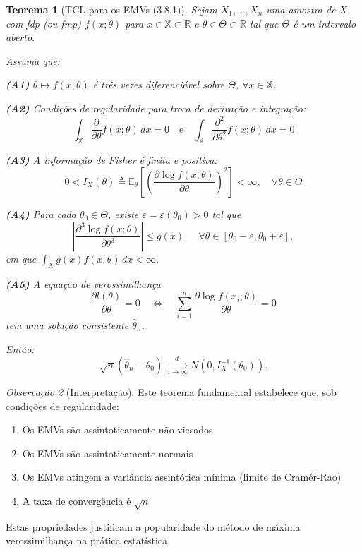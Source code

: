 \documentclass[12pt,a4paper]{article}
\theoremstyle{plain}
\newtheorem{teorema}{Teorema}[section]
\theoremstyle{definition}
\theoremstyle{remark}
\newtheorem{observacao}[teorema]{Observação}
\begin{document}
\begin{teorema}[TCL para os EMVs (3.8.1)]
Sejam $X_1, \ldots, X_n$ uma amostra de $X$ com fdp (ou fmp) $f(x; \theta)$ para $x \in \mathbb{X} \subset \mathbb{R}$ e $\theta \in \Theta \subset \mathbb{R}$ tal que $\Theta$ é um intervalo aberto.

Assuma que:

\textbf{(A1)} $\theta \mapsto f(x; \theta)$ é três vezes diferenciável sobre $\Theta$, $\forall x \in \mathbb{X}$.

\textbf{(A2)} Condições de regularidade para troca de derivação e integração:
\[
\int_{\mathbb{X}} \frac{\partial}{\partial \theta} f(x; \theta) \, dx = 0 \quad \text{e} \quad \int_{\mathbb{X}} \frac{\partial^2}{\partial \theta^2} f(x; \theta) \, dx = 0
\]

\textbf{(A3)} A informação de Fisher é finita e positiva:
\[
0 < I_X(\theta) \triangleq \mathbb{E}_\theta \left[ \left( \frac{\partial \log f(x; \theta)}{\partial \theta} \right)^2 \right] < \infty, \quad \forall \theta \in \Theta
\]

\textbf{(A4)} Para cada $\theta_0 \in \Theta$, existe $\varepsilon = \varepsilon(\theta_0) > 0$ tal que
\[
\left| \frac{\partial^3 \log f(x; \theta)}{\partial \theta^3} \right| \leq g(x), \quad \forall \theta \in [\theta_0 - \varepsilon, \theta_0 + \varepsilon],
\]
em que $\int_X g(x) f(x; \theta) \, dx < \infty$.

\textbf{(A5)} A equação de verossimilhança
\[
\frac{\partial l(\theta)}{\partial \theta} = 0 \quad \Leftrightarrow \quad \sum_{i=1}^n \frac{\partial \log f(x_i; \theta)}{\partial \theta} = 0
\]
tem uma solução consistente $\hat{\theta}_n$.

Então:
\[
\sqrt{n} (\hat{\theta}_n - \theta_0) \xrightarrow[n \to \infty]{d} N\left(0, I_X^{-1}(\theta_0)\right).
\]
\end{teorema}

\begin{observacao}[Interpretação]
Este teorema fundamental estabelece que, sob condições de regularidade:
\begin{enumerate}
    \item Os EMVs são assintoticamente não-viesados
    \item Os EMVs são assintoticamente normais
    \item Os EMVs atingem a variância assintótica mínima (limite de Cramér-Rao)
    \item A taxa de convergência é $\sqrt{n}$
\end{enumerate}
Estas propriedades justificam a popularidade do método de máxima verossimilhança na prática estatística.
\end{observacao}
\end{document}
